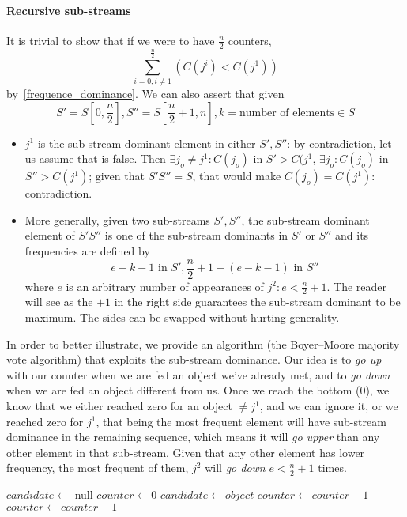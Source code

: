 \paragraph{Recursive sub-streams} It is trivial to show that if we were to have $\frac{n}{2}$ counters,
\begin{equation*}
\sum^{\frac{n}{2}}_{i = 0, i \neq 1}\left( C(j^{i}) < C(j^{1}) \right)
\end{equation*}
by~\ref{frequence_dominance}.
We can also assert that given
\begin{equation*}
  S' = S[0, \frac{n}{2}], S'' = S[\frac{n}{2} + 1, n], k = \text{number of elements} \in S
\end{equation*}
    \begin{itemize}
    \item \textbf{$j^{1}$} is the sub-stream dominant element in either $S', S''$: by contradiction, let us assume that is false.
    Then $\exists j_{o} \neq j^{1}: C(j_{o})$ in $S' > C(j^{1}$, $\exists j_{o}: C(j_{o})$ in $S'' > C(j^{1})$; given that $S'S'' = S$, that would make $C(j_{o}) = C(j^{1})$: contradiction.
    \item More generally, given two sub-streams $S', S''$, the sub-stream dominant element of $S'S''$ is one of the sub-stream dominants in $S'$ or $S''$ and its frequencies are defined by $$e - k - 1\textrm{ in } S', \frac{n}{2} + 1 - (e - k - 1) \textrm{ in } S''$$ where $e$ is an arbitrary number of appearances of $j^{2}: e < \frac{n}{2} + 1$.
    The reader will see as the $+1$ in the right side guarantees the sub-stream dominant to be maximum.
    The sides can be swapped without hurting generality.
    \end{itemize}

In order to better illustrate, we provide an algorithm (the Boyer–Moore majority vote algorithm) that exploits the sub-stream dominance.
Our idea is to \emph{go up} with our counter when we are fed an object we've already met, and to \emph{go down} when we are fed an object different from us.
Once we reach the bottom (0), we know that we either reached zero for an object $\neq j^{1}$, and we can ignore it, or we reached zero for $j^{1}$, that being the most frequent element will have sub-stream dominance in the remaining sequence, which means it will \emph{go upper} than any other element in that sub-stream.
Given that any other element has lower frequency, the most frequent of them, $j^{2}$ will \emph{go down} $e < \frac{n}{2} + 1$ times.

\begin{algorithmic}[1]
    \State $candidate \gets$ null
    \State $counter \gets 0$
         \State $candidate \gets object$ 
         \State $counter \gets counter + 1$
         \State $counter \gets counter - 1$
       \EndIf
    \EndFor
    \State {}
  \EndFunction
\end{algorithmic}